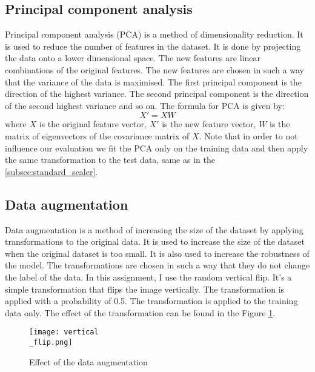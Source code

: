 \documentclass{article}
\begin{document}
\subsection{Principal component analysis}
Principal component analysis (PCA) is a method of dimensionality reduction. It is used to reduce the number of features in the dataset. It is done by projecting the data onto a lower dimensional space. The new features are linear combinations of the original features. The new features are chosen in such a way that the variance of the data is maximised. The first principal component is the direction of the highest variance. The second principal component is the direction of the second highest variance and so on. The formula for PCA is given by:
\begin{equation}
    X' = XW
\end{equation}
where $X$ is the original feature vector, $X'$ is the new feature vector, $W$ is the matrix of eigenvectors of the covariance matrix of $X$. Note that in order to not influence our evaluation we fit the PCA only on the training data and then apply the same transformation to the test data, same as in the \ref{subsec:standard_scaler}.

\subsection{Data augmentation}
Data augmentation is a method of increasing the size of the dataset by applying transformations to the original data. It is used to increase the size of the dataset when the original dataset is too small. It is also used to increase the robustness of the model. The transformations are chosen in such a way that they do not change the label of the data. In this assignment, I use the random vertical flip. It's a simple transformation that flips the image vertically. The transformation is applied with a probability of 0.5. The transformation is applied to the training data only. The effect of the transformation can be found in the Figure \ref{fig:augmentation}.

\begin{figure}[h]
    \centering
    \texttt{[image: vertical\\\_flip.png]}
    \caption{Effect of the data augmentation}
    \label{fig:augmentation}
\end{figure}
\end{document}
